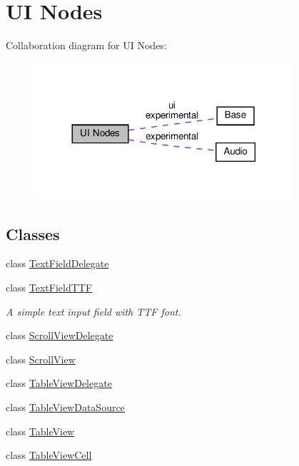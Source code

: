 \hypertarget{group__ui}{}\section{UI Nodes}
\label{group__ui}
Collaboration diagram for UI Nodes\+:
\nopagebreak
\begin{figure}[H]
\begin{center}
\leavevmode
\includegraphics[width=272pt]{group__ui}
\end{center}
\end{figure}
\subsection*{Classes}
\begin{DoxyCompactItemize}
\item 
class \hyperlink{classTextFieldDelegate}{Text\+Field\+Delegate}
\item 
class \hyperlink{classTextFieldTTF}{Text\+Field\+T\+TF}
\begin{DoxyCompactList}\small\item\em A simple text input field with T\+TF font. \end{DoxyCompactList}\item 
class \hyperlink{classScrollViewDelegate}{Scroll\+View\+Delegate}
\item 
class \hyperlink{classScrollView}{Scroll\+View}
\item 
class \hyperlink{classTableViewDelegate}{Table\+View\+Delegate}
\item 
class \hyperlink{classTableViewDataSource}{Table\+View\+Data\+Source}
\item 
class \hyperlink{classTableView}{Table\+View}
\item 
class \hyperlink{classTableViewCell}{Table\+View\+Cell}
\end{DoxyCompactItemize}
